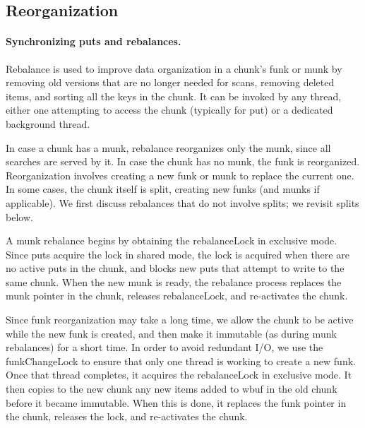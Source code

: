 \subsection{Reorganization}
\label{ssec:rebalance}

\paragraph{Synchronizing puts and rebalances.}

Rebalance is used to improve data organization in a chunk's funk or munk by removing old versions that are no longer needed for scans, 
removing deleted items, and sorting all the keys in the chunk. 
It can be invoked by any thread, either one attempting to access the chunk (typically for put) or a dedicated background thread.

In case a chunk has a munk, rebalance reorganizes only  the munk, since all searches are served by it. In case the chunk has no munk, the funk is reorganized. Reorganization involves creating a new funk or munk 
to replace the  current one.  In some cases, the chunk itself is split, creating new funks (and munks if applicable). We first discuss 
rebalances that do not involve splits; we revisit splits below.

A munk rebalance begins by obtaining the rebalanceLock in exclusive mode. Since puts acquire the lock in shared mode,
the lock is acquired when there are no active puts in the chunk, and blocks new puts that attempt to write to the same chunk. 
When the new munk is ready, the rebalance process replaces the munk pointer in the chunk, releases rebalanceLock, and re-activates the chunk.

Since funk reorganization may take a long time, we allow the chunk to be active while the new funk is created,
and then make it immutable (as during munk rebalances) for a short time. In order to avoid redundant I/O, 
we use the funkChangeLock to ensure that only one thread is working to create a new funk.  Once that thread
completes, it acquires the rebalanceLock in exclusive mode.
It then copies to the new chunk any new items added to wbuf in the old chunk before it became immutable. 
When this is done, it replaces the funk pointer in the chunk, releases the lock, and re-activates the chunk.

